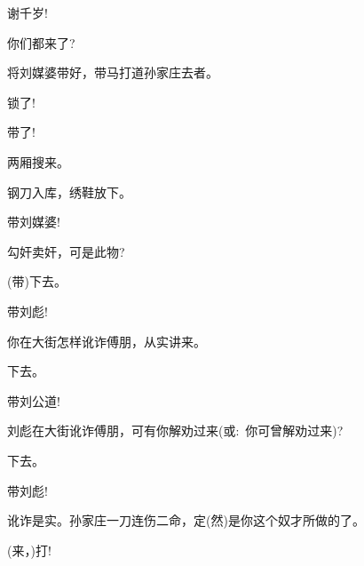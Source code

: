 {


{谢千岁!}\hspace{30pt}~

{\vspace{5pt}}

{你们都来了?}\hspace{30pt}~

{将刘媒婆带好，带马打道孙家庄去者。}

{\vspace{5pt}}

{锁了!}\hspace{40pt}~

{带了!}\hspace{40pt}~

{两厢搜来。}\hspace{30pt}~

{钢刀入库，绣鞋放下。}\hspace{10pt}~

{带刘媒婆!}\hspace{30pt}~

{勾奸卖奸，可是此物?}\hspace{10pt}~

{(带)下去。}\hspace{30pt}~

{带刘彪!}\hspace{30pt}~

{你在大街怎样讹诈傅朋，从实讲来。}

{下去。}\hspace{40pt}~

{带刘公道!}\hspace{30pt}~

{刘彪在大街讹诈傅朋，可有你解劝过来({\akai 或}:~你可曾解劝过来)?}

{下去。}\hspace{40pt}~

{带刘彪!}\hspace{30pt}~

{讹诈是实。孙家庄一刀连伤二命，定(然)是你这个奴才所做的了。}

{(来，)打!}\hspace{30pt}~

}

